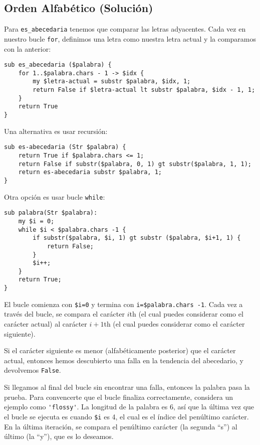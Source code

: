 \subsection{Orden Alfabético (Solución)}

Para \verb|es_abecedaria| tenemos que comparar las letras adyacentes.
Cada vez en nuestro bucle {\tt for}, definimos una letra como nuestra
letra actual y la comparamos con la anterior:

\begin{verbatim}
sub es_abecedaria ($palabra) {
    for 1..$palabra.chars - 1 -> $idx {    
        my $letra-actual = substr $palabra, $idx, 1;
        return False if $letra-actual lt substr $palabra, $idx - 1, 1;  
    }     
    return True
}
\end{verbatim}

Una alternativa es usar recursión:

\begin{verbatim}
sub es-abecedaria (Str $palabra) {
    return True if $palabra.chars <= 1;
    return False if substr($palabra, 0, 1) gt substr($palabra, 1, 1);
    return es-abecedaria substr $palabra, 1;
}
\end{verbatim}

Otra opción es usar bucle {\tt while}:

\begin{verbatim}
sub palabra(Str $palabra):
    my $i = 0;
    while $i < $palabra.chars -1 {
        if substr($palabra, $i, 1) gt substr ($palabra, $i+1, 1) {
            return False;
        }
        $i++;
    }
    return True;
}
\end{verbatim}
%
El bucle comienza con {\tt \$i=0} y termina con {\tt i=\$palabra.chars -1}.
Cada vez a través del bucle, se compara el carácter $i$th (el cual puedes
considerar como el carácter actual) al carácter $i+1$th (el cual puedes
considerar como el carácter siguiente).

Si el carácter siguiente es menor (alfabéticamente posterior) que el 
carácter actual, entonces hemos descubierto una falla en la tendencia
del abecedario, y devolvemos {\tt False}.

Si llegamos al final del bucle sin encontrar una falla, entonces
la palabra pasa la prueba. Para convencerte que el bucle finaliza
correctamente, considera un ejemplo como \verb|'flossy'|. La
longitud de la palabra es 6, así que la última vez que el bucle 
se ejecuta es cuando \verb|$i| es 4, el cual es el índice del
penúltimo carácter. En la última iteración, se compara el penúltimo
carácter (la segunda ``s'') al último (la ``y''), que es lo
deseamos.
